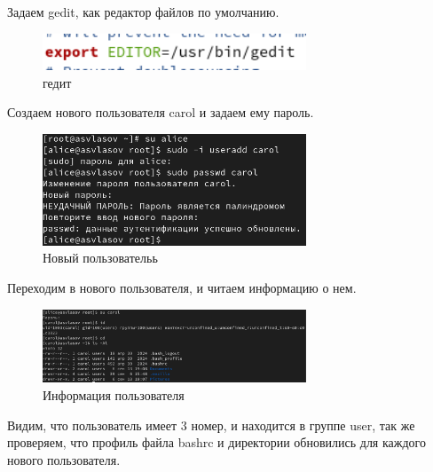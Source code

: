 \documentclass[
  12pt,
  a4paper,
  DIV=11,
  numbers=noendperiod]{scrreprt}
\begin{document}
Задаем gedit, как редактор файлов по умолчанию.

\begin{figure}

{\centering \includegraphics[width=0.7\textwidth,height=\textheight]{image/9.png}

}

\caption{гедит}

\end{figure}%

Создаем нового пользователя carol и задаем ему пароль.

\begin{figure}

{\centering \includegraphics[width=0.7\textwidth,height=\textheight]{image/10.png}

}

\caption{Новый пользовательь}

\end{figure}%

Переходим в нового пользователя, и читаем информацию о нем.

\begin{figure}

{\centering \includegraphics[width=0.7\textwidth,height=\textheight]{image/11.png}

}

\caption{Информация пользователя}

\end{figure}%

Видим, что пользователь имеет 3 номер, и находится в группе user, так же
проверяем, что профиль файла bashrc и директории обновились для каждого
нового пользователя.
\end{document}
